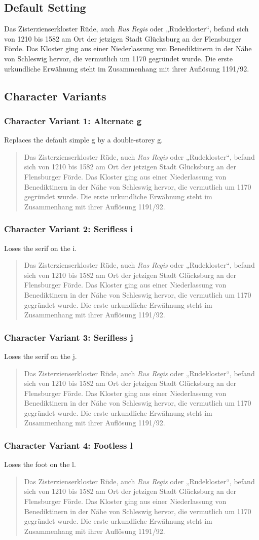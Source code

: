 \def\sample{Das Zisterzienserkloster Rüde, auch \emph{Rus Regis} oder „Rudekloster“, befand sich von 1210 bis 1582 am Ort der jetzigen Stadt Glücksburg an der Flensburger Förde. Das Kloster ging aus einer Niederlassung von Benediktinern in der Nähe von Schleswig hervor, die vermutlich um 1170 gegründet wurde. Die erste urkundliche Erwähnung steht im Zusammenhang mit ihrer Auflösung 1191/92.}

\subsection{Default Setting}
\sample

\subsection{Character Variants}

\subsubsection{Character Variant 1: Alternate g}
Replaces the default simple g by a double-storey g.
\begin{quote}
{ \sample}
\end{quote}

\subsubsection{Character Variant 2: Serifless i}
Loses the serif on the i.
\begin{quote}
{ \sample}
\end{quote}

\subsubsection{Character Variant 3: Serifless j}
Loses the serif on the j.
\begin{quote}
{ \sample}
\end{quote}

\subsubsection{Character Variant 4: Footless l}
Loses the foot on the l.
\begin{quote}
{ \sample}
\end{quote}

